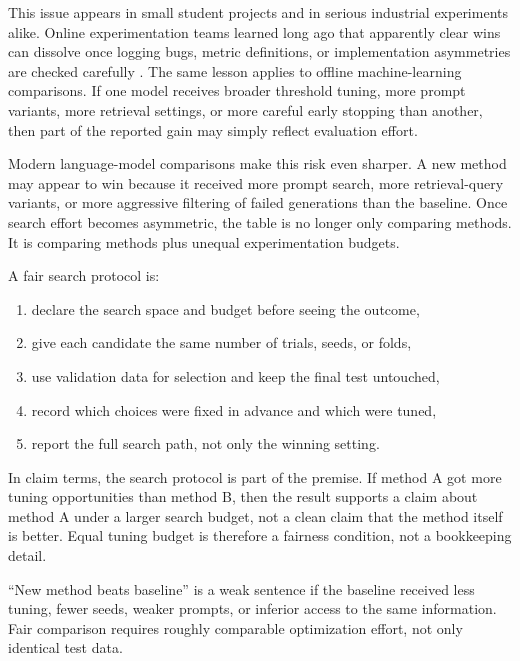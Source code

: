This issue appears in small student projects and in serious industrial experiments alike. Online experimentation teams learned long ago that apparently clear wins can dissolve once logging bugs, metric definitions, or implementation asymmetries are checked carefully \citep{kohavi2012,kohavi2013}. The same lesson applies to offline machine-learning comparisons. If one model receives broader threshold tuning, more prompt variants, more retrieval settings, or more careful early stopping than another, then part of the reported gain may simply reflect evaluation effort.

Modern language-model comparisons make this risk even sharper. A new method may appear to win because it received more prompt search, more retrieval-query variants, or more aggressive filtering of failed generations than the baseline. Once search effort becomes asymmetric, the table is no longer only comparing methods. It is comparing methods plus unequal experimentation budgets.

\begin{practicalnote}
A fair search protocol is:
\begin{enumerate}[leftmargin=*]
\item declare the search space and budget before seeing the outcome,
\item give each candidate the same number of trials, seeds, or folds,
\item use validation data for selection and keep the final test untouched,
\item record which choices were fixed in advance and which were tuned,
\item report the full search path, not only the winning setting.
\end{enumerate}
\end{practicalnote}

In claim terms, the search protocol is part of the premise. If method A got more tuning opportunities than method B, then the result supports a claim about method A under a larger search budget, not a clean claim that the method itself is better. Equal tuning budget is therefore a fairness condition, not a bookkeeping detail.

\begin{failurebox}
``New method beats baseline'' is a weak sentence if the baseline received less tuning, fewer seeds, weaker prompts, or inferior access to the same information. Fair comparison requires roughly comparable optimization effort, not only identical test data.
\end{failurebox}

